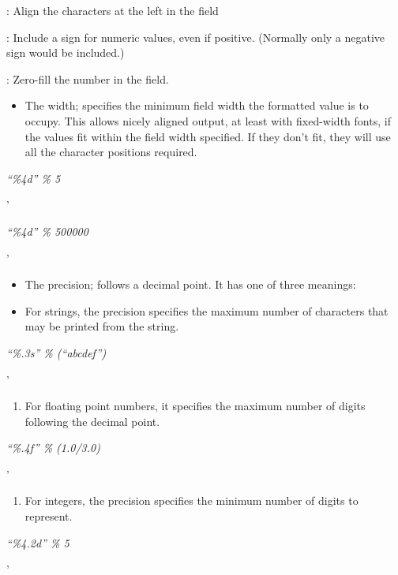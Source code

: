  : Align the characters at
the left in the field

 : Include a sign for
numeric values, even if positive. (Normally only a negative sign would
be included.)

 : Zero-fill the number in
the field.

\begin{itemize}

\item
   The width;
  specifies the minimum field width the formatted value is to occupy.
  This allows nicely aligned output, at least with fixed-width fonts, if
  the values fit within the field width specified. If they don't fit,
  they will use all the character positions required.
\end{itemize}


\emph{``\textbar{}\%4d\textbar{}'' \% 5}

'


\emph{``\textbar{}\%4d\textbar{}'' \% 500000}

'

\begin{itemize}

\item
   The
  precision; follows a decimal point. It has one of three meanings:
\item
  For strings, the precision
  specifies the maximum number of characters that may be printed from
  the string.
\end{itemize}


\emph{``\textbar{}\%.3s\textbar{}'' \% (``abcdef'')}

'

\begin{enumerate}

\item
  For floating point numbers, it
  specifies the maximum number of digits following the decimal point.
\end{enumerate}


\emph{``\textbar{}\%.4f\textbar{}'' \% (1.0/3.0)}

'

\begin{enumerate}

\item
  For integers, the precision
  specifies the minimum number of digits to represent.
\end{enumerate}


\emph{``\textbar{}\%4.2d\textbar{}'' \% 5}

'

